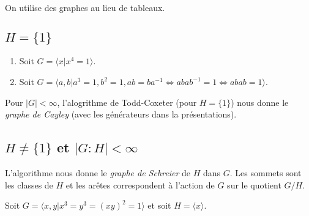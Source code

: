   On utilise des graphes au lieu de tableaux.
  
  \subsection{$H = \{1\}$}

  \begin{exs}
    \begin{enumerate}
    \item Soit $G = \langle x | x^4 = 1 \rangle$.

    \item Soit $G = \langle a, b | a^3 = 1, b^2 = 1, ab = ba^{-1} \iff abab^{-1} = 1 \iff abab = 1 \rangle$.
    \end{enumerate}
  \end{exs}

  
  Pour $|G| < \infty$, l'alogrithme de Todd-Coxeter (pour $H = \{1\}$) nous donne le \emph{graphe de Cayley}
   (avec les générateurs dans la présentations).


  \subsection{$H \neq \{1\}$ et $|G:H| < \infty$}

  L'algorithme nous donne le \emph{graphe de Schreier}  de $H$ dans $G$. Les sommets
  sont les classes de $H$ et les arêtes correspondent à l'action de $G$ sur le quotient $G/H$.

  \begin{ex}
    Soit $G = \langle x, y | x^3 = y^3 = (xy)^2 = 1 \rangle$ et soit $H = \langle x \rangle$.
  \end{ex}




     

